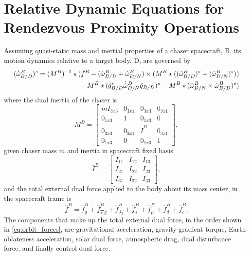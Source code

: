 \documentclass[letterpaper, preprint, paper,11pt]{AAS}	%
\begin{document}
\section{Relative Dynamic Equations for Rendezvous Proximity Operations}
Assuming quasi-static mass and inertial properties of a chaser spacecraft, B, its motion dynamics relative to a target body, D, are governed by
\begin{equation}
\begin{aligned}
	\label{eq:dyn}
	(\dot{\hat{\omega}}^B_{B/D})^s = (M^B)^{-1}\star(\hat{f}^B-(\hat{\omega}^B_{B/D}+\hat{\omega}^B_{D/N})\times(M^B\star((\hat{\omega}^B_{B/D})^s+(\hat{\omega}^B_{D/N})^s))\\-M^B\star(\hat{q}^*_{B/D}\dot{\hat{\omega}}^D_{D/N}\hat{q}_{B/D})^s-M^B\star(\hat{\omega}^B_{D/N}\times\hat{\omega}^B_{B/D})^s)
\end{aligned}\\
\end{equation}
where the dual inertia of the chaser is
\begin{equation}
\label{eq:dual_inertia}
M^B = 
\begin{bmatrix} 
mI_{3x3} & 0_{3x1} & 0_{3x3} & 0_{3x1} \\ 
0_{1x3} & 1 & 0_{1x3} & 0 \\ 
0_{3x3} & 0_{3x1} & \bar{I}^B & 0_{3x1} \\ 
0_{1x3} & 0 & 0_{1x3} & 1 
\end{bmatrix}, 
\end{equation}
given chaser mass $m$ and inertia in spacecraft fixed basis
\begin{equation}
\label{eq:sc_inertia}
\bar{I}^B = 
\begin{bmatrix} 
I_{11} & I_{12}& I_{13} \\ 
I_{21} & I_{22}& I_{23}\\ 
I_{31} & I_{32}& I_{33}
\end{bmatrix},
\end{equation}
and the total external dual force applied to the body about its mass center, in the spacecraft frame is
\begin{equation}
\label{eq:orbit_forces}
\hat{f}^B = \hat{f}^B_g + \hat{f}^B_{\nabla g} + \hat{f}^B_{J_2} +\hat{f}^B_{s}+\hat{f}^B_{\mu} + \hat{f}^B_d + \hat{f}^B_c.
\end{equation}
The components that make up the total external dual force, in the order shown in \eqref{eq:orbit_forces}, are gravitational acceleration, gravity-gradient torque, Earth-oblateness acceleration, solar dual force, atmospheric drag, dual disturbance force, and finally control dual force.
\end{document}
